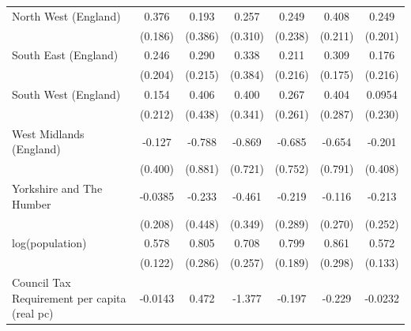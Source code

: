 \begin{table}[htbp]
\begin{tabular}{l*{6}{c}}
\addlinespace
North West (England)&       0.376\sym{**} &       0.193         &       0.257         &       0.249         &       0.408\sym{*}  &       0.249         \\
                    &     (0.186)         &     (0.386)         &     (0.310)         &     (0.238)         &     (0.211)         &     (0.201)         \\
\addlinespace
South East (England)&       0.246         &       0.290         &       0.338         &       0.211         &       0.309\sym{*}  &       0.176         \\
                    &     (0.204)         &     (0.215)         &     (0.384)         &     (0.216)         &     (0.175)         &     (0.216)         \\
\addlinespace
South West (England)&       0.154         &       0.406         &       0.400         &       0.267         &       0.404         &      0.0954         \\
                    &     (0.212)         &     (0.438)         &     (0.341)         &     (0.261)         &     (0.287)         &     (0.230)         \\
\addlinespace
West Midlands (England)&      -0.127         &      -0.788         &      -0.869         &      -0.685         &      -0.654         &      -0.201         \\
                    &     (0.400)         &     (0.881)         &     (0.721)         &     (0.752)         &     (0.791)         &     (0.408)         \\
\addlinespace
Yorkshire and The Humber&     -0.0385         &      -0.233         &      -0.461         &      -0.219         &      -0.116         &      -0.213         \\
                    &     (0.208)         &     (0.448)         &     (0.349)         &     (0.289)         &     (0.270)         &     (0.252)         \\
\addlinespace
log(population)     &       0.578\sym{***}&       0.805\sym{***}&       0.708\sym{***}&       0.799\sym{***}&       0.861\sym{***}&       0.572\sym{***}\\
                    &     (0.122)         &     (0.286)         &     (0.257)         &     (0.189)         &     (0.298)         &     (0.133)         \\
\addlinespace
Council Tax Requirement per capita (real pc)&     -0.0143         &       0.472         &      -1.377         &      -0.197         &      -0.229         &     -0.0232         \\

\end{tabular}
\end{table}
